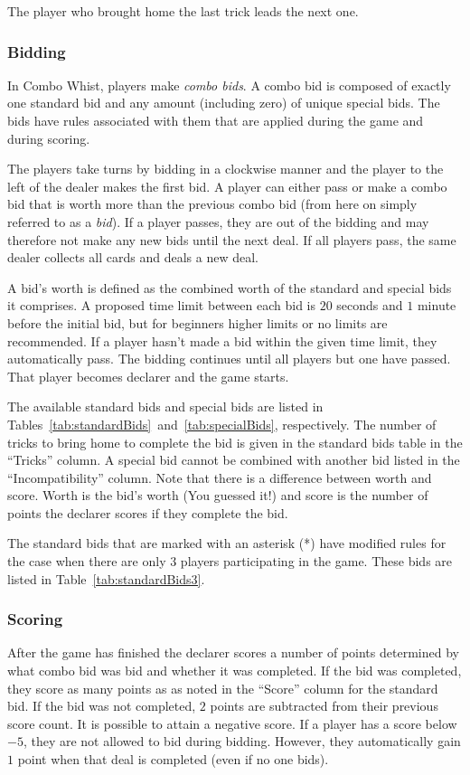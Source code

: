 \documentclass[a4paper]{article}
\begin{document}
{{{				 The player who brought home the last trick leads the next one.
			}

			\subsubsection{Bidding}{\label{sec:bidding}
				In Combo Whist, players make \emph{combo bids}. A combo bid is composed of exactly one standard bid and any amount (including zero) of unique special bids. The bids have rules associated with them that are applied during the game and during scoring.

				The players take turns by bidding in a clockwise manner and the player to the left of the dealer makes the first bid. A player can either pass or make a combo bid that is worth more than the previous combo bid (from here on simply referred to as a \emph{bid}). If a player passes, they are out of the bidding and may therefore not make any new bids until the next deal. If all players pass, the same dealer collects all cards and deals a new deal.

				A bid's worth is defined as the combined worth of the standard and special bids it comprises. A proposed time limit between each bid is $20$ seconds and $1$ minute before the initial bid, but for beginners higher limits or no limits are recommended. If a player hasn't made a bid within the given time limit, they automatically pass. The bidding continues until all players but one have passed. That player becomes declarer and the game starts.

				The available standard bids and special bids are listed in Tables~\ref{tab:standardBids}~and~\ref{tab:specialBids}, respectively. The number of tricks to bring home to complete the bid is given in the standard bids table in the ``Tricks'' column. A special bid cannot be combined with another bid listed in the ``Incompatibility'' column. Note that there is a difference between worth and score. Worth is the bid's worth (You guessed it!) and score is the number of points the declarer scores if they complete the bid.

				The standard bids that are marked with an asterisk (*) have modified rules for the case when there are only $3$ players participating in the game. These bids are listed in Table~\ref{tab:standardBids3}.

			}

			\subsubsection{Scoring}{%
				After the game has finished the declarer scores a number of points determined by what combo bid was bid and whether it was completed. If the bid was completed, they score as many points as as noted in the ``Score'' column for the standard bid. If the bid was not completed, $2$ points are subtracted from their previous score count. It is possible to attain a negative score. If a player has a score below $-5$, they are not allowed to bid during bidding. However, they automatically gain $1$ point when that deal is completed (even if no one bids).
			}

}}
\end{document}

